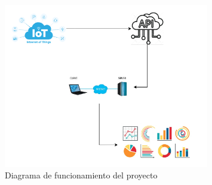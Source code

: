 
\begin{figure}[ht]
    \centering
    \includegraphics[width=0.8\textwidth]{imagenes/contenido/diagrama-fun.png}
    \caption{Diagrama de funcionamiento del proyecto}
    \label{fig:diagrama_funcionamiento}
\end{figure}